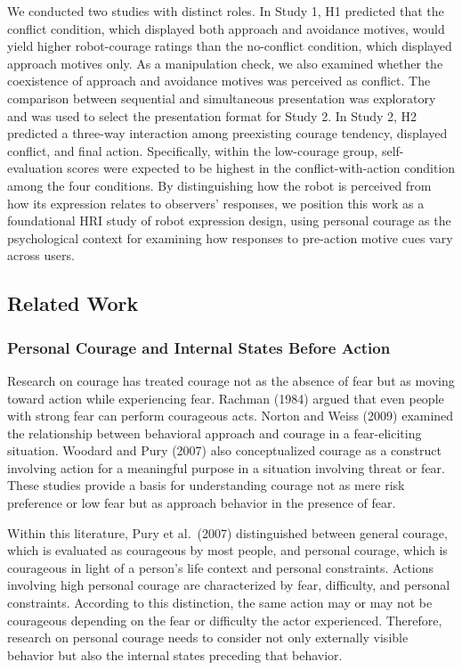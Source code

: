 We conducted two studies with distinct roles. In Study 1, H1 predicted
that the conflict condition, which displayed both approach and avoidance
motives, would yield higher robot-courage ratings than the no-conflict
condition, which displayed approach motives only. As a manipulation
check, we also examined whether the coexistence of approach and
avoidance motives was perceived as conflict. The comparison between
sequential and simultaneous presentation was exploratory and was used to
select the presentation format for Study 2. In Study 2, H2 predicted a
three-way interaction among preexisting courage tendency, displayed
conflict, and final action. Specifically, within the low-courage group,
self-evaluation scores were expected to be highest in the
conflict-with-action condition among the four conditions. By
distinguishing how the robot is perceived from how its expression
relates to observers' responses, we position this work as a foundational
HRI study of robot expression design, using personal courage as the
psychological context for examining how responses to pre-action motive
cues vary across users.

\subsection{Related Work}\label{related-work}

\subsubsection{Personal Courage and Internal States Before
Action}\label{personal-courage-and-internal-states-before-action}

Research on courage has treated courage not as the absence of fear but
as moving toward action while experiencing fear. Rachman (1984) argued
that even people with strong fear can perform courageous acts. Norton
and Weiss (2009) examined the relationship between behavioral approach
and courage in a fear-eliciting situation. Woodard and Pury (2007) also
conceptualized courage as a construct involving action for a meaningful
purpose in a situation involving threat or fear. These studies provide a
basis for understanding courage not as mere risk preference or low fear
but as approach behavior in the presence of fear.

Within this literature, Pury et al.~(2007) distinguished between general
courage, which is evaluated as courageous by most people, and personal
courage, which is courageous in light of a person's life context and
personal constraints. Actions involving high personal courage are
characterized by fear, difficulty, and personal constraints. According
to this distinction, the same action may or may not be courageous
depending on the fear or difficulty the actor experienced. Therefore,
research on personal courage needs to consider not only externally
visible behavior but also the internal states preceding that behavior.

